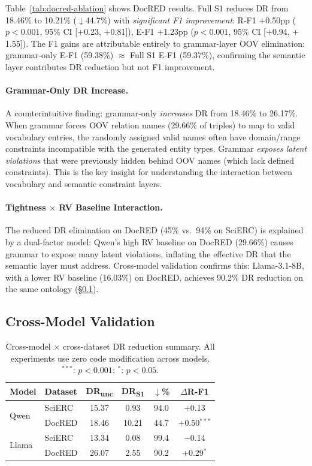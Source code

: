 \documentclass[11pt,a4paper]{article}
\begin{document}
Table~\ref{tab:docred-ablation} shows DocRED results.
Full S1 reduces DR from 18.46\% to 10.21\% ($\downarrow$44.7\%) with \emph{significant F1 improvement}: R-F1 $+$0.50pp ($p{<}0.001$, 95\% CI [$+$0.23, $+$0.81]), E-F1 $+$1.23pp ($p{<}0.001$, 95\% CI [$+$0.94, $+$1.55]).
The F1 gains are attributable entirely to grammar-layer OOV elimination: grammar-only E-F1 (59.38\%) $\approx$ Full S1 E-F1 (59.37\%), confirming the semantic layer contributes DR reduction but not F1 improvement.

\paragraph{Grammar-Only DR Increase.}
A counterintuitive finding: grammar-only \emph{increases} DR from 18.46\% to 26.17\%.
When grammar forces OOV relation names (29.66\% of triples) to map to valid vocabulary entries, the randomly assigned valid names often have domain/range constraints incompatible with the generated entity types.
Grammar \emph{exposes latent violations} that were previously hidden behind OOV names (which lack defined constraints).
This is the key insight for understanding the interaction between vocabulary and semantic constraint layers.

\paragraph{Tightness $\times$ RV Baseline Interaction.}
The reduced DR elimination on DocRED (45\% vs.\ 94\% on SciERC) is explained by a dual-factor model: Qwen's high RV baseline on DocRED (29.66\%) causes grammar to expose many latent violations, inflating the effective DR that the semantic layer must address.
Cross-model validation confirms this: Llama-3.1-8B, with a lower RV baseline (16.03\%) on DocRED, achieves 90.2\% DR reduction on the same ontology (\S\ref{sec:crossmodel}).

\subsection{Cross-Model Validation}
\label{sec:crossmodel}

\begin{table}[t]
\centering
\small
\begin{tabular}{llcccc}
\toprule
\textbf{Model} & \textbf{Dataset} & \textbf{DR\textsubscript{unc}} & \textbf{DR\textsubscript{S1}} & \textbf{$\downarrow$\%} & \textbf{$\Delta$R-F1} \\
\midrule
\multirow{2}{*}{Qwen} & SciERC & 15.37 & 0.93 & 94.0 & $+$0.13 \\
& DocRED & 18.46 & 10.21 & 44.7 & $+$0.50$^{***}$ \\
\midrule
\multirow{2}{*}{Llama} & SciERC & 13.34 & 0.08 & 99.4 & $-$0.14 \\
& DocRED & 26.07 & 2.55 & 90.2 & $+$0.29$^{*}$ \\
\bottomrule
\end{tabular}
\caption{Cross-model $\times$ cross-dataset DR reduction summary. All experiments use zero code modification across models. $^{***}$: $p{<}0.001$; $^{*}$: $p{<}0.05$.}
\label{tab:crossmodel}
\end{table}
\end{document}
